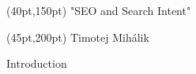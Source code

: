 \documentclass[aspectratio=169]{beamer}
\begin{document}

\begin{textblock*}{1000pt}(40pt,150pt)
\color{white}  \huge "SEO and Search Intent"
\end{textblock*}
\date{}


{ 


\begin{textblock*}{1000pt}(45pt,200pt)
\color{white}  \small
 Timotej Mihálik 
\end{textblock*}

\maketitle
{


\begin{frame} {\huge Introduction}



\end{frame}}}
\end{document}
